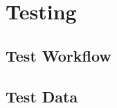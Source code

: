 \chapter{Testing}
\lipsum[2-3]
\section{Test Workflow}
\lipsum[9-12]
\section{Test Data}
\lipsum[7-9]
